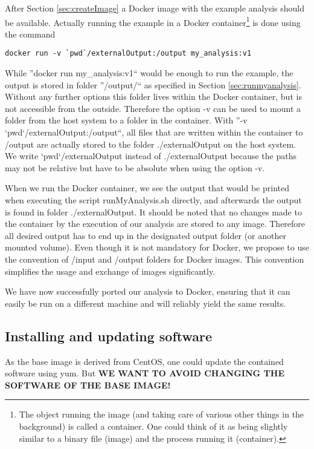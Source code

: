 \documentclass[a4paper, twoside, 11pt]{article}
\begin{document}
After Section \ref{sec:createImage} a Docker image with the example analysis should be available. 
Actually running the example in a Docker container\footnote{The object running the image 
(and taking care of various other things in the background) is called a container. 
One could think of it as being slightly similar to a binary file (image) and the process running it (container).} 
is done using the command 
\begin{lstlisting}[basicstyle=\ttfamily\small,columns=flexible,keepspaces=true,frame=single]
docker run -v `pwd`/externalOutput:/output my_analysis:v1
\end{lstlisting}
While ''docker run my\_analysis:v1``
would be enough to run the example, the output is stored in folder 
''/output/`` as specified in Section \ref{sec:runmyanalysis}.
Without any further options this folder lives within the Docker container, but is not accessible from the outside. 
Therefore the option -v can be used to mount a folder from the host system to a folder in the container. 
With ''-v `pwd`/externalOutput:/output``, all files that are written within the container to /output 
are actually stored to the folder ./externalOutput on the host system. 
We write `pwd`/externalOutput instead of ./externalOutput because the 
paths may not be relative but have to be absolute when using the option -v. 

When we run the Docker container, we see the output that would be printed when 
executing the script runMyAnalysis.sh directly, and afterwards the output is found in folder ./externalOutput. 
It should be noted that no changes made to the container by the execution of our analysis 
are stored to any image. 
Therefore all desired output has to end up in the designated output folder (or another mounted volume). 
Even though it is not mandatory for Docker, 
we propose to use the convention of /input and /output folders for Docker images. 
This convention simplifies the usage and exchange of images significantly. 

We have now successfully ported our analysis to Docker, ensuring that it can easily be run  
on a different machine and will reliably yield the same results. 



\subsection{Installing and updating software}
\label{sec:installSoftware}
As the base image is derived from CentOS, one could update the contained software using yum. 
But \textbf{WE WANT TO AVOID CHANGING THE SOFTWARE OF THE BASE IMAGE!}
\end{document}

